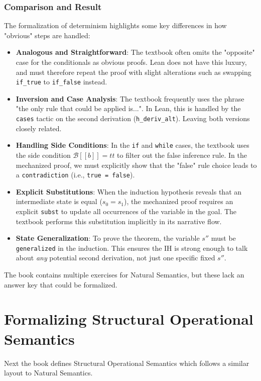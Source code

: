 \subsubsection*{Comparison and Result}
The formalization of determinism highlights some key differences in how
"obvious" steps are handled:
\begin{itemize}
    \item \textbf{Analogous and Straightforward}:
    The textbook often omits the "opposite" case for the conditionals as obvious proofs.
    Lean does not have this luxury, and must therefore repeat the proof with slight alterations
    such as swapping \texttt{if\_true} to  \texttt{if\_false} instead.

    \item \textbf{Inversion and Case Analysis}:
    The textbook frequently uses the phrase "the only rule that could be applied
    is...". In Lean, this is handled by the \texttt{cases} tactic
    on the second derivation (\texttt{h\_deriv\_alt}).
    Leaving both versions closely related.
    
    \item \textbf{Handling Side Conditions}:
    In the \texttt{if} and \texttt{while} cases, the textbook uses the side condition
    $\mathcal{B}[\![b]\!] = tt$ to filter out the false inference rule.
    In the mechanized proof, we must explicitly show that the "false" rule
    choice leads to a \texttt{contradiction} (i.e., \texttt{true = false}).
    
    \item \textbf{Explicit Substitutions}:
    When the induction hypothesis reveals that an intermediate state is equal
    ($s_0 = s_1$), the mechanized proof requires an explicit \texttt{subst}
    to update all occurrences of the variable in the goal. The textbook performs
    this substitution implicitly in its narrative flow.
    
    \item \textbf{State Generalization}:
    To prove the theorem, the variable $s''$ must be \\
    \texttt{generalized} in the induction.
    This ensures the IH is strong enough to talk about
    \textit{any} potential second derivation, not just one specific fixed $s''$.
\end{itemize}
The book contains multiple exercises for Natural Semantics, but these lack an answer key that could be formalized.


%
%
%
\section{Formalizing Structural Operational Semantics}
\label{formal_ns_sos_equiv:sec:sos:formalization}
Next the book defines Structural Operational Semantics which follows a similar layout to Natural Semantics.

